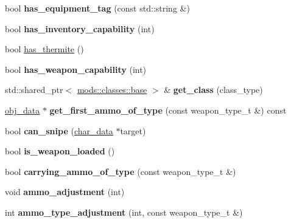 \begin{DoxyCompactItemize}
bool {\bfseries has\+\_\+equipment\+\_\+tag} (const std\+::string \&)
\item 
\mbox{\label{classmods_1_1player_a388ff716cb50f09aac0748bb96a42b6d}} 
bool {\bfseries has\+\_\+inventory\+\_\+capability} (int)
\item 
bool \hyperlink{classmods_1_1player_a7aa761f41a093581ba531b2aca325609}{has\+\_\+thermite} ()
\item 
\mbox{\label{classmods_1_1player_aaf5f1cd8b7e1ce4a83dde5b9726a4e44}} 
bool {\bfseries has\+\_\+weapon\+\_\+capability} (int)
\item 
\mbox{\label{classmods_1_1player_a49ddff24cd20e0289bfaf3c6a74ac0ac}} 
std\+::shared\+\_\+ptr$<$ \hyperlink{structmods_1_1classes_1_1base}{mods\+::classes\+::base} $>$ \& {\bfseries get\+\_\+class} (class\+\_\+type)
\item 
\mbox{\label{classmods_1_1player_a3e3f07ba7e2d33db31f75f6e9a8c1663}} 
\hyperlink{structobj__data}{obj\+\_\+data} $\ast$ {\bfseries get\+\_\+first\+\_\+ammo\+\_\+of\+\_\+type} (const weapon\+\_\+type\+\_\+t \&) const
\item 
\mbox{\label{classmods_1_1player_af03346ba20be5abc4371d38c65934172}} 
bool {\bfseries can\+\_\+snipe} (\hyperlink{structchar__data}{char\+\_\+data} $\ast$target)
\item 
\mbox{\label{classmods_1_1player_ac61916af7f7983f789be3da07d8eef99}} 
bool {\bfseries is\+\_\+weapon\+\_\+loaded} ()
\item 
\mbox{\label{classmods_1_1player_a34eb82a07bfcf1cda938b295a263b692}} 
bool {\bfseries carrying\+\_\+ammo\+\_\+of\+\_\+type} (const weapon\+\_\+type\+\_\+t \&)
\item 
\mbox{\label{classmods_1_1player_a24f37b27f2a8e2265c825b92dc9126f7}} 
void {\bfseries ammo\+\_\+adjustment} (int)
\item 
\mbox{\label{classmods_1_1player_a505508f9f4abf3d019137f56529cee2e}} 
int {\bfseries ammo\+\_\+type\+\_\+adjustment} (int, const weapon\+\_\+type\+\_\+t \&)

\end{DoxyCompactItemize}
